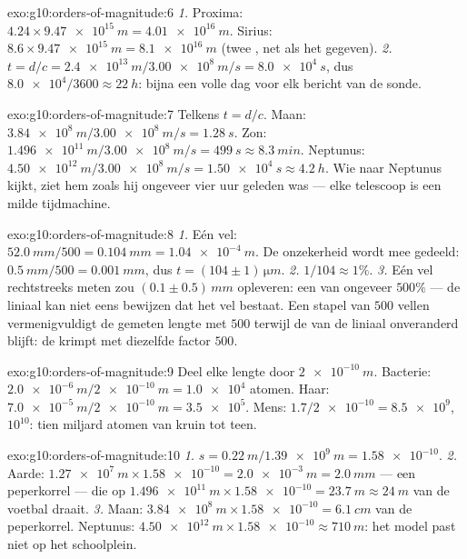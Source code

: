 \begin{solution}{exo:g10:orders-of-magnitude:6}
\emph{1.} Proxima:
$4.24 \times \qty{9.47e15}{m} = \qty{4.01e16}{m}$. Sirius:
$8.6 \times \qty{9.47e15}{m} = \qty{8.1e16}{m}$ (twee , net als het gegeven).
\emph{2.} $t = d/c = \qty{2.4e13}{m} / \qty{3.00e8}{m/s}
= \qty{8.0e4}{s}$, dus $\num{8.0e4}/3600 \approx \qty{22}{h}$: bijna
een volle dag voor elk bericht van de sonde.
\end{solution}

\begin{solution}{exo:g10:orders-of-magnitude:7}
Telkens $t = d/c$. Maan:
$\qty{3.84e8}{m}/\qty{3.00e8}{m/s} = \qty{1.28}{s}$. Zon:
$\qty{1.496e11}{m}/\qty{3.00e8}{m/s} = \qty{499}{s} \approx
\qty{8.3}{min}$. Neptunus:
$\qty{4.50e12}{m}/\qty{3.00e8}{m/s} = \qty{1.50e4}{s} \approx
\qty{4.2}{h}$. Wie naar Neptunus kijkt, ziet hem zoals hij ongeveer
vier uur geleden was --- elke telescoop is een milde tijdmachine.
\end{solution}

\begin{solution}{exo:g10:orders-of-magnitude:8}
\emph{1.} Eén vel: $\qty{52.0}{mm}/500 = \qty{0.104}{mm}
= \qty{1.04e-4}{m}$. De onzekerheid wordt mee gedeeld:
$\qty{0.5}{mm}/500 = \qty{0.001}{mm}$, dus
$t = (104 \pm 1)\,\unit{\micro m}$.
\emph{2.} $1/104 \approx 1\%$.
\emph{3.} Eén vel rechtstreeks meten zou $(0.1 \pm 0.5)\,\unit{mm}$
opleveren: een  van ongeveer $500\%$ --- de
liniaal kan niet eens bewijzen dat het vel bestaat. Een stapel van
$500$ vellen vermenigvuldigt de gemeten lengte met $500$ terwijl de
 van de liniaal onveranderd blijft: de  krimpt met diezelfde factor $500$.
\end{solution}

\begin{solution}{exo:g10:orders-of-magnitude:9}
Deel elke lengte door $\qty{2e-10}{m}$. Bacterie:
$\qty{2.0e-6}{m}/\qty{2e-10}{m} = \num{1.0e4}$ atomen. Haar:
$\qty{7.0e-5}{m}/\qty{2e-10}{m} = \num{3.5e5}$. Mens:
$1.7/\num{2e-10} = \num{8.5e9}$,  $10^{10}$: tien miljard
atomen van kruin tot teen.
\end{solution}

\begin{solution}{exo:g10:orders-of-magnitude:10}
\emph{1.} $s = \qty{0.22}{m}/\qty{1.39e9}{m} = \num{1.58e-10}$.
\emph{2.} Aarde:
$\qty{1.27e7}{m} \times \num{1.58e-10} = \qty{2.0e-3}{m} =
\qty{2.0}{mm}$ --- een peperkorrel --- die op
$\qty{1.496e11}{m} \times \num{1.58e-10} = \qty{23.7}{m} \approx
\qty{24}{m}$ van de voetbal draait.
\emph{3.} Maan:
$\qty{3.84e8}{m} \times \num{1.58e-10} = \qty{6.1}{cm}$ van de
peperkorrel. Neptunus:
$\qty{4.50e12}{m} \times \num{1.58e-10} \approx \qty{710}{m}$: het
model past niet op het schoolplein.
\end{solution}

